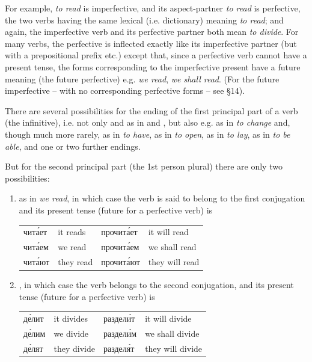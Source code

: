 For example,  \emph{to read} is imperfective, and its aspect-partner  \emph{to read} is perfective, the two verbs having the same lexical (i.e. dictionary) meaning \emph{to read}; and again, the imperfective verb  and its perfective partner  both mean \emph{to divide}. For many verbs, the perfective is inflected exactly like its imperfective partner (but with a prepositional prefix  etc.) except that, since a perfective verb cannot have a present tense, the forms corresponding to the imperfective present have a future meaning (the future perfective) e.g.  \emph{we read},  \emph{we shall read}. (For the future imperfective -- with no corresponding perfective forms -- see §14).

There are several possibilities for the ending of the first principal part of a verb (the infinitive), i.e. not only  and  as in  and , but also e.g.  as in  \emph{to change} and, though much more rarely,  as in  \emph{to have},  as in  \emph{to open},  as in  \emph{to lay},  as in  \emph{to be able}, and one or two further endings.

But for the second principal part (the 1st person plural) there are only two possibilities:
\begin{enumerate}[label=\roman*)]
\item {} as in  \emph{we read}, in which case the verb is said to belong to the first conjugation and its present tense (future for a perfective verb) is
\begin{center}\small
\begin{tabular}{@{}>{\cyrillicfont}ll >{\cyrillicfont}ll@{}}
чита́ет & it reads & прочита́ет & it will read\\
чита́ем & we read & прочита́ем & we shall read\\
чита́ют & they read & прочита́ют & they will read
\end{tabular}\end{center}
\item {}, in which case the verb belongs to the second conjugation, and its present tense (future for a perfective verb) is
\begin{center}\small
\begin{tabular}{@{}>{\cyrillicfont}ll >{\cyrillicfont}ll@{}}
де́лит & it divides & раздели́т & it will divide\\
де́лим & we divide & раздели́м & we shall divide\\
де́лят & they divide & разделя́т & they will divide
\end{tabular}\end{center}
\end{enumerate}

